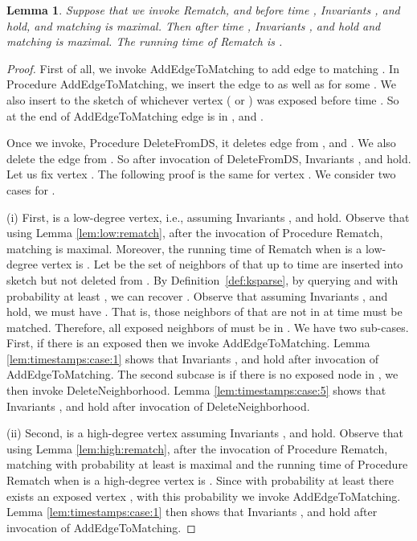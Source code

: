 \documentclass[11pt,letter]{article}
\newtheorem{lemma}[theorem]{Lemma}
\begin{document}
\begin{lemma}
\label{lem:timestamps:case:6}
Suppose that we invoke {\sf Rematch}, and
 before time , Invariants ,  and  hold,
and matching  is maximal.
Then after time , Invariants ,  and  hold and
matching  is maximal.
The running time of  {\sf Rematch} is .
\end{lemma}

\begin{proof}
First of all, we invoke {\sf AddEdgeToMatching} to add edge 
to matching . In Procedure {\sf AddEdgeToMatching}, we insert the edge to
 as well as  for some .
We also insert  to the sketch of
whichever vertex ( or ) was exposed before time .
So at the end of {\sf AddEdgeToMatching} edge  is in ,  and .

Once we invoke, Procedure {\sf DeleteFromDS}, it deletes edge  from
,  and . We also delete the edge from . So after invocation of
{\sf DeleteFromDS}, Invariants ,  and  hold.
Let us fix vertex . The following proof is the same for vertex .
We consider two cases for .

(i) First,  is a low-degree vertex, i.e., 
assuming Invariants ,  and  hold. Observe that using
Lemma \ref{lem:low:rematch}, after the invocation of Procedure
{\sf Rematch}, matching  is maximal.
Moreover, the running time of {\sf Rematch} when  is
a low-degree vertex is .
Let  be the set of neighbors of  that up to time 
are inserted into sketch  but not deleted from .
By Definition~\ref{def:ksparse},
by querying  and with probability at least , we can recover .
Observe that assuming Invariants ,  and  hold, we must have
.
That is, those neighbors of
 that are not in  at time  must be matched.
Therefore, all exposed neighbors of  must be in .
We have two sub-cases. First, if there is an exposed
 then we invoke {\sf AddEdgeToMatching}.
Lemma \ref{lem:timestamps:case:1} shows that Invariants ,  and  hold
after invocation of {\sf AddEdgeToMatching}.
The second subcase is if there is no exposed node in , we then invoke
{\sf DeleteNeighborhood}.
Lemma \ref{lem:timestamps:case:5} shows that Invariants ,  and  hold
after invocation of {\sf DeleteNeighborhood}.



(ii) Second,  is a high-degree vertex assuming Invariants ,  and  hold.
Observe that using Lemma \ref{lem:high:rematch}, after the invocation of Procedure
{\sf Rematch}, matching  with probability at least 
is maximal and the running time of Procedure {\sf Rematch}
when  is a high-degree vertex is .
Since with probability at least  there exists an exposed vertex
, with this probability we invoke {\sf AddEdgeToMatching}.
Lemma \ref{lem:timestamps:case:1} then shows that Invariants ,  and  hold
after invocation of {\sf AddEdgeToMatching}.
\end{proof}
\end{document}

